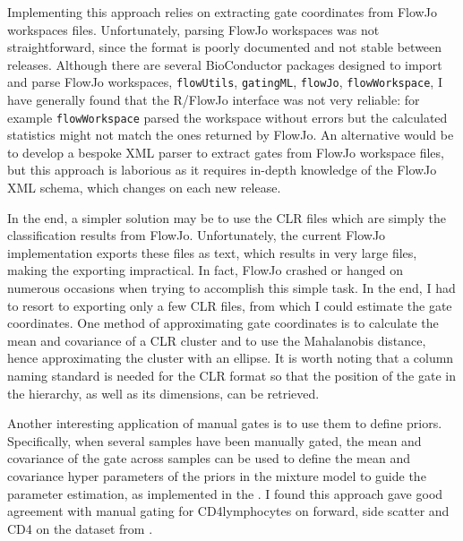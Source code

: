 Implementing this approach relies on extracting gate coordinates from FlowJo workspaces files.
Unfortunately, parsing FlowJo workspaces was not straightforward, since the format is poorly documented and not stable between releases.
Although there are several BioConductor packages designed to import and parse FlowJo workspaces, \texttt{flowUtils}, \texttt{gatingML}, \texttt{flowJo}, \texttt{flowWorkspace}, I have generally found that the R/FlowJo interface was not very reliable: for example \texttt{flowWorkspace} parsed the workspace without errors but the calculated statistics might not match the ones returned by FlowJo.
An alternative would be to develop a bespoke XML parser to extract gates from FlowJo workspace files, but this approach is laborious as it requires in-depth knowledge of the FlowJo XML schema, which changes on each new release.

In the end, a simpler solution may be to use the CLR files which are simply the classification results from FlowJo.
Unfortunately, the current FlowJo implementation exports these files as text, which results in very large files, making the exporting impractical. 
In fact, FlowJo crashed or hanged on numerous occasions when trying to accomplish this simple task.
In the end, I had to resort to exporting only a few CLR files, from which I could estimate the gate coordinates.
One method of approximating gate coordinates is to calculate the mean and covariance of a CLR cluster and to use the Mahalanobis distance, hence approximating the cluster with an ellipse.
It is worth noting that a column naming standard is needed for the CLR format so that the position of the gate in the hierarchy, as well as its dimensions, can be retrieved.

Another interesting application of manual gates is to use them to define priors.
Specifically, when several samples have been manually gated, the mean and covariance of the gate across samples can be used to define the mean and covariance hyper parameters of the priors in the mixture model to guide the parameter estimation, as implemented in the .
I found this approach gave good agreement with manual gating for CD4\positive lymphocytes on forward, side scatter and CD4 on the dataset from .

